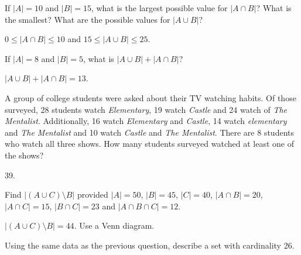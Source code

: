 \begin{questions}
\begin{answer}
  \end{answer}


  
\question If $|A| = 10$ and $|B| = 15$, what is the largest possible value for $|A \cap B|$?  What is the smallest?  What are the possible values for $|A \cup B|$?

  \begin{answer}
    $0 \le |A \cap B| \le 10$ and $15 \le |A \cup B| \le 25$.
  \end{answer}



\question If $|A| = 8$ and $|B| = 5$, what is $|A \cup B| + |A \cap B|$?

  \begin{answer}
      $|A \cup B| + |A \cap B| = 13$.
  \end{answer}

  
  
  
\question A group of college students were asked about their TV watching habits.  Of those surveyed, 28 students watch {\em Elementary}, 19 watch {\em Castle} and 24 watch of {\em The Mentalist}.  Additionally, 16 watch {\em Elementary} and {\em Castle}, 14 watch {\em elementary} and {\em The Mentalist} and 10 watch {\em Castle} and {\em The Mentalist}.  There are 8 students who watch all three shows.  How many students surveyed watched at least one of the shows?

  \begin{answer}
    39.
  \end{answer}



\question Find $|(A \cup C)\setminus B|$ provided $|A| = 50$, $|B| = 45$, $|C| = 40$, $|A\cap B| = 20$, $|A \cap C| = 15$, $|B \cap C| = 23$ and $|A \cap B \cap C| = 12$.

    \begin{answer}
      $|(A \cup C)\setminus B| = 44$.  Use a Venn diagram.
    \end{answer}



\question Using the same data as the previous question, describe a set with cardinality 26.


\end{questions}
